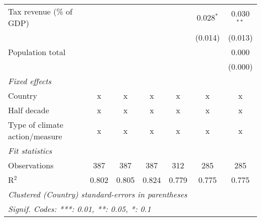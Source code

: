 \begin{tabular}{lcccccc}
   Tax revenue (\% of GDP)                    &         &              &                &                & 0.028$^{*}$    & 0.030$^{**}$\\   
                                              &         &              &                &                & (0.014)        & (0.013)\\   
   Population total                           &         &              &                &                &                & 0.000\\   
                                              &         &              &                &                &                & (0.000)\\   
   \emph{Fixed effects}\\
   Country                                    & x       & x            & x              & x              & x              & x\\  
   Half decade                                & x       & x            & x              & x              & x              & x\\  
   Type of climate action/measure             & x       & x            & x              & x              & x              & x\\  
   \midrule \emph{Fit statistics}\\
   Observations                               & 387     & 387          & 387            & 312            & 285            & 285\\  
   R$^2$                                      & 0.802   & 0.805        & 0.824          & 0.779          & 0.775          & 0.775\\  
   \midrule
   \multicolumn{7}{l}{\emph{Clustered (Country) standard-errors in parentheses}}\\
   \multicolumn{7}{l}{\emph{Signif. Codes: ***: 0.01, **: 0.05, *: 0.1}}\\
\end{tabular}
\par\endgroup


